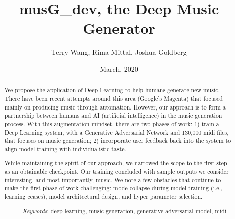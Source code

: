 \documentclass[12pt,oneside]{chicagocapstone}
\title{musG\_dev, the Deep Music Generator}
\author{Terry Wang, Rima Mittal, Joshua Goldberg}
\date{March, 2020} %
\begin{document}
  \maketitle

\frontmatter %
\pagestyle{empty} %


  \begin{abstract}
    We propose the application of Deep Learning to help humans generate new music. There have been recent attempts around this area (Google's Magenta) that focused mainly on producing music through automation. However, our approach is to form a partnership between humans and AI (artificial intelligence) in the music generation process. With this augmentation mindset, there are two phases of work: 1) train a Deep Learning system, with a Generative Adversarial Network and 130,000 midi files, that focuses on music generation; 2) incorporate user feedback back into the system to align model training with individualistic taste.
    
    While maintaining the spirit of our approach, we narrowed the scope to the first step as an obtainable checkpoint. Our training concluded with sample outputs we consider interesting, and most importantly, music. We note a few obstacles that continue to make the first phase of work challenging: mode collapse during model training (i.e., learning ceases), model architectural design, and hyper parameter selection.
    
    \bigskip 
    \bigskip
    \bigskip
    
    ~~~~~~\emph{Keywords}: deep learning, music generation, generative adversarial model, midi
    
    \bigskip 
    \bigskip
    \bigskip
  \end{abstract}
\end{document}
